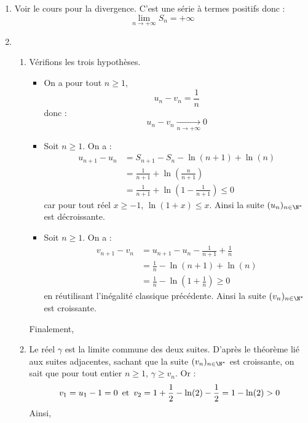 \documentclass[a4paper,twoside,french,10pt]{VcCours}
\begin{document}
\begin{enumerate}
        
        \item Voir le cours pour la divergence. C'est une série à termes positifs donc :
        $$\boxed{ \lim_{n \rightarrow + \infty} S_n = + \infty}$$
        
        
        \item
        \begin{enumerate}
            \item Vérifions les trois hypothèses.
            
            \begin{itemize}
            \item On a pour tout $n \geq 1$,
            $$u_n-v_n=\frac{1}{n}$$
            donc :
            $$u_n-v_n \mathop{\longrightarrow}\limits_{n\to+\infty}0$$
            \item Soit $n \geq 1$. On a :
            \begin{align*}
            u_{n+1}-u_n& =S_{n+1}-S_n-\ln(n+1)+\ln(n) \\
            & =\frac{1}{n+1}+\ln\left(\frac{n}{n+1}\right) \\
            & =\frac{1}{n+1}+\ln\left(1-\frac{1}{n+1}\right)\leq 0
            \end{align*}
            car pour tout réel $x \geq -1$, $\ln(1+x) \leq x$.  Ainsi la suite $(u_n)_{n\in\N^*}$ est décroissante.
            \item Soit $n \geq 1$. On a :
            \begin{align*}
            v_{n+1}-v_n& =u_{n+1}-u_n-\frac{1}{n+1}+\frac{1}{n} \\
            & =\frac{1}{n}-\ln(n+1)+\ln(n) \\
            & =\frac{1}{n}-\ln\left(1+\frac1{n}\right)\geq 0
            \end{align*}
            en réutilisant l'inégalité classique précédente. Ainsi la suite $(v_n)_{n\in\N^*}$ est croissante.
            \end{itemize}
    Finalement, 
            
            
        
        \item Le réel $\gamma$ est la limite commune des deux suites. D'après le théorème lié aux suites adjacentes, sachant que la suite $(v_n)_{n\in\N^*}$ est croissante, on sait que pour tout entier $n \geq 1$, $\gamma\geq v_n$. Or :
    $$v_1=u_1-1=0 \, \hbox{ et } \, v_2=1+\frac{1}{2}-\ln(2)-\frac{1}{2}=1-\ln(2)>0$$
    Ainsi,
        

\end{enumerate}
\end{enumerate}
\end{document}
